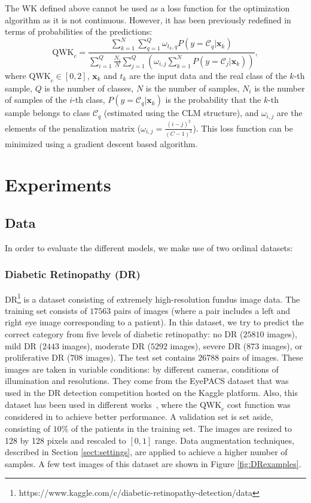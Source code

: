 \documentclass[preprint]{elsarticle}
\begin{document}
The WK defined above cannot be used as a loss function for the optimization algorithm as it is not continuous. However, it has been previously redefined \cite{de2018weighted} in terms of probabilities of the predictions:
\begin{equation}
\nonumber
\text{QWK}_c = \frac{\sum\limits_{k=1}^N \sum\limits_{q=1}^Q \omega_{t_k, q} P(y = \mathcal{C}_q | \mathbf{x}_k)}{\sum\limits_{i=1}^Q \frac{N_i}{N} \sum\limits_{j=1}^Q ( \omega_{i,j} \sum\limits_{k=1}^N P(y = \mathcal{C}_j | \mathbf{x}_k))},
\end{equation}
where $\text{QWK}_c \in [0,2]$, $\mathbf{x}_k$ and $t_k$ are the input data and the real class of the $k$-th sample, $Q$ is the number of classes, $N$ is the number of samples, $N_i$ is the number of samples of the $i$-th class, $P(y = \mathcal{C}_q | \mathbf{x}_k)$ is the probability that the $k$-th sample belongs to class $\mathcal{C}_q$ (estimated using the CLM structure), and $\omega_{i,j}$ are the elements of the penalization matrix ($\omega_{i,j} = \frac{(i-j)^2}{(C-1)^2}$). This loss function can be minimized using a gradient descent based algorithm.

\section{Experiments}
\label{sect:experiments}
\subsection{Data}
In order to evaluate the different models, we make use of two ordinal datasets:
\subsubsection{Diabetic Retinopathy (DR)}
DR\footnote{https://www.kaggle.com/c/diabetic-retinopathy-detection/data} is a dataset consisting of extremely high-resolution fundus image data. The training set consists of $17563$ pairs of images (where a  pair includes a left and right eye image corresponding to a patient). In this dataset, we try to predict the correct category from five levels of diabetic retinopathy: no DR ($25810$ images), mild DR ($2443$ images), moderate DR ($5292$ images), severe DR ($873$ images), or proliferative DR ($708$ images). The test set contains $26788$ pairs of images. These images are taken in variable conditions: by different cameras,  conditions of illumination and resolutions. They come from the EyePACS dataset that was used in the DR detection competition hosted on the Kaggle platform. Also, this dataset has been used in different works~\cite{de2018weighted,nebot2016diabetic}, where the $\text{QWK}_c$ cost function was considered in \cite{de2018weighted} to achieve better performance. A validation set is set aside, consisting of $10\%$ of the patients in the training set. The images are resized to 128 by 128 pixels and rescaled to $[0,1]$ range. Data augmentation techniques, described in Section \ref{sect:settings}, are applied to achieve a higher number of samples. A few test images of this dataset are shown in Figure \ref{fig:DRexamples}.
\end{document}
